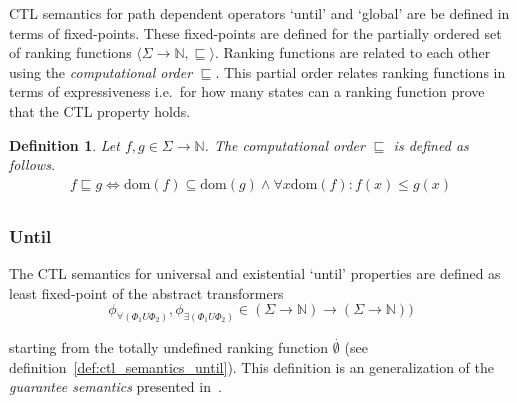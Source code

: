 \documentclass[11pt,a4paper,titlepage]{article}
\newtheorem{definition}{Definition}[section]
\begin{document}
CTL semantics for path dependent operators `until' and `global' are be defined in terms of fixed-points. 
These fixed-points are defined for the partially ordered set of ranking functions $\langle \Sigma \rightarrow \mathbb{N}, \sqsubseteq \rangle$. 
Ranking functions are related to each other using the \textit{computational order} $\sqsubseteq$. 
This partial order relates ranking functions in terms of expressiveness i.e.\ for how many states can a ranking function prove that the CTL property holds.

\begin{definition}\label{def:computational_order}
    Let $f, g \in \Sigma \rightarrow \mathbb{N}$. 
    The \textit{computational order} $\sqsubseteq$ is defined as follows.
    \begin{align*}
        f \sqsubseteq g \iff \text{dom}(f) \subseteq \text{dom}(g) \land \forall x \text{dom}(f): f(x) \leq g(x) \\
    \end{align*}
\end{definition}

\subsubsection*{Until}

The CTL semantics for universal and existential `until' properties are defined as least fixed-point of the abstract transformers
\[
\phi_{\forall(\Phi_1 U \Phi_2)}, \phi_{\exists(\Phi_1 U \Phi_2)} 
\in (\Sigma \rightarrow \mathbb{N}) \rightarrow (\Sigma \rightarrow \mathbb{N}))
\]

starting from the totally undefined ranking function $\overset{.}{\emptyset}$ (see definition~\ref{def:ctl_semantics_until}).
This definition is an generalization of the \textit{guarantee semantics} presented in~\cite{UrbanM-VMCAI15}. 
\end{document}
